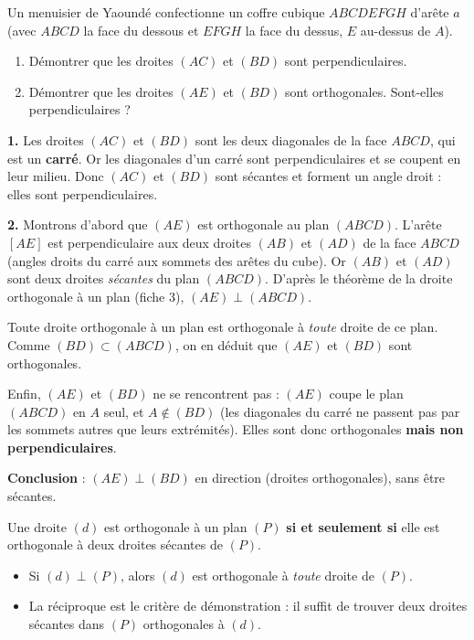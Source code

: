 \documentclass[11pt]{article}
\newcommand{\cle}[1]{{\popxbold\color{popdark}#1}}
\newcounter{popsec}
\newcounter{popsub}
\newcommand{\courssub}[1]{%
  \stepcounter{popsub}%
  \par\vspace{9pt}\noindent{\popxbold\fontsize{11.5}{13}\selectfont\color{popink}{\color{poporange}\thepopsec.\thepopsub}\hspace{6pt}#1}\par\nopagebreak\vspace{4pt}
}
\begin{document}
\begin{exoresolu}
Un menuisier de Yaoundé confectionne un coffre cubique $ABCDEFGH$ d'arête $a$ (avec $ABCD$ la face du dessous et $EFGH$ la face du dessus, $E$ au-dessus de $A$).
\begin{enumerate}
\item Démontrer que les droites $(AC)$ et $(BD)$ sont perpendiculaires.
\item Démontrer que les droites $(AE)$ et $(BD)$ sont orthogonales. Sont-elles perpendiculaires ?
\end{enumerate}
\tcblower
\textbf{1.} Les droites $(AC)$ et $(BD)$ sont les deux diagonales de la face $ABCD$, qui est un \textbf{carré}. Or les diagonales d'un carré sont perpendiculaires et se coupent en leur milieu. Donc $(AC)$ et $(BD)$ sont sécantes et forment un angle droit : elles sont \cle{perpendiculaires}.

\medskip
\textbf{2.} Montrons d'abord que $(AE)$ est orthogonale au plan $(ABCD)$. L'arête $[AE]$ est perpendiculaire aux deux droites $(AB)$ et $(AD)$ de la face $ABCD$ (angles droits du carré aux sommets des arêtes du cube). Or $(AB)$ et $(AD)$ sont deux droites \emph{sécantes} du plan $(ABCD)$. D'après le théorème de la droite orthogonale à un plan (fiche 3), $(AE) \perp (ABCD)$.

Toute droite orthogonale à un plan est orthogonale à \emph{toute} droite de ce plan. Comme $(BD) \subset (ABCD)$, on en déduit que $(AE)$ et $(BD)$ sont \cle{orthogonales}.

Enfin, $(AE)$ et $(BD)$ ne se rencontrent pas : $(AE)$ coupe le plan $(ABCD)$ en $A$ seul, et $A \notin (BD)$ (les diagonales du carré ne passent pas par les sommets autres que leurs extrémités). Elles sont donc orthogonales \textbf{mais non perpendiculaires}.

\textbf{Conclusion} : $(AE) \perp (BD)$ en direction (droites orthogonales), sans être sécantes.
\end{exoresolu}

\courssub{Droite orthogonale à un plan}

\begin{aretenir}
Une droite $(d)$ est orthogonale à un plan $(P)$ \textbf{si et seulement si} elle est orthogonale à \cle{deux droites sécantes} de $(P)$.
\begin{itemize}
\item Si $(d) \perp (P)$, alors $(d)$ est orthogonale à \emph{toute} droite de $(P)$.
\item La réciproque est le critère de démonstration : il suffit de trouver deux droites sécantes dans $(P)$ orthogonales à $(d)$.
\end{itemize}
\end{aretenir}
\end{document}
